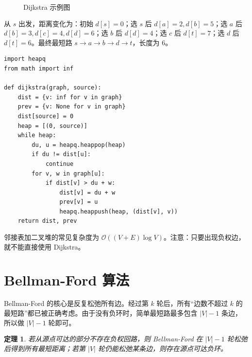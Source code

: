 \documentclass[UTF8,oneside,12pt]{ctexbook}
\newtheorem{theorem}{定理}[chapter]
\newcommand{\bigO}{\mathcal O}
\begin{document}
\begin{figure}[htbp]
\centering
{}
\caption{Dijkstra 示例图}
\end{figure}

从 $s$ 出发，距离变化为：初始 $d[s]=0$；选 $s$ 后 $d[a]=2,d[b]=5$；选 $a$ 后 $d[b]=3,d[c]=4,d[d]=6$；选 $b$ 后 $d[d]=4$；选 $c$ 后 $d[t]=7$；选 $d$ 后 $d[t]=6$。最终最短路 $s\to a\to b\to d\to t$，长度为 6。

\begin{lstlisting}
import heapq
from math import inf

def dijkstra(graph, source):
    dist = {v: inf for v in graph}
    prev = {v: None for v in graph}
    dist[source] = 0
    heap = [(0, source)]
    while heap:
        du, u = heapq.heappop(heap)
        if du != dist[u]:
            continue
        for v, w in graph[u]:
            if dist[v] > du + w:
                dist[v] = du + w
                prev[v] = u
                heapq.heappush(heap, (dist[v], v))
    return dist, prev
\end{lstlisting}

邻接表加二叉堆的常见复杂度为 $\bigO((V+E)\log V)$。注意：只要出现负权边，就不能直接使用 Dijkstra。

\section{Bellman-Ford 算法}
Bellman-Ford 的核心是反复松弛所有边。经过第 $k$ 轮后，所有“边数不超过 $k$ 的最短路”都已被正确考虑。由于没有负环时，简单最短路最多包含 $|V|-1$ 条边，所以做 $|V|-1$ 轮即可。

\begin{theorem}
若从源点可达的部分不存在负权回路，则 Bellman-Ford 在 $|V|-1$ 轮松弛后得到所有最短距离；若第 $|V|$ 轮仍能松弛某条边，则存在源点可达负环。
\end{theorem}
\end{document}
